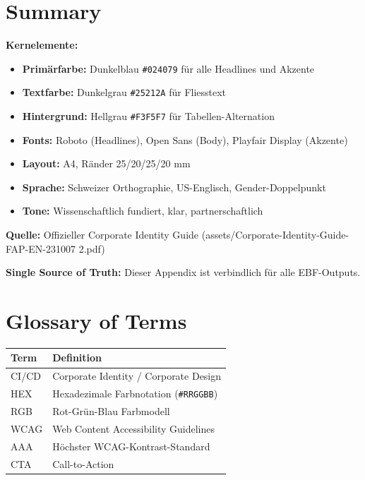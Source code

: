 
\section{Summary}
\label{sec:sg-summary}

\begin{tcolorbox}[colback=blue!5!white, colframe=blue!75!black, title=Summary: FehrAdvice Style Guide]
\textbf{Kernelemente:}
\begin{itemize}
    \item \textbf{Primärfarbe:} Dunkelblau \texttt{\#024079} für alle Headlines und Akzente
    \item \textbf{Textfarbe:} Dunkelgrau \texttt{\#25212A} für Fliesstext
    \item \textbf{Hintergrund:} Hellgrau \texttt{\#F3F5F7} für Tabellen-Alternation
    \item \textbf{Fonts:} Roboto (Headlines), Open Sans (Body), Playfair Display (Akzente)
    \item \textbf{Layout:} A4, Ränder 25/20/25/20 mm
    \item \textbf{Sprache:} Schweizer Orthographie, US-Englisch, Gender-Doppelpunkt
    \item \textbf{Tone:} Wissenschaftlich fundiert, klar, partnerschaftlich
\end{itemize}

\textbf{Quelle:} Offizieller Corporate Identity Guide (assets/Corporate-Identity-Guide-FAP-EN-231007 2.pdf)

\textbf{Single Source of Truth:} Dieser Appendix ist verbindlich für alle EBF-Outputs.
\end{tcolorbox}



\section{Glossary of Terms}
\label{sec:sg-glossary}

\begin{tabular}{ll}
\textbf{Term} & \textbf{Definition} \\
\hline
CI/CD & Corporate Identity / Corporate Design \\
HEX & Hexadezimale Farbnotation (\texttt{\#RRGGBB}) \\
RGB & Rot-Grün-Blau Farbmodell \\
WCAG & Web Content Accessibility Guidelines \\
AAA & Höchster WCAG-Kontrast-Standard \\
CTA & Call-to-Action \\
\end{tabular}

